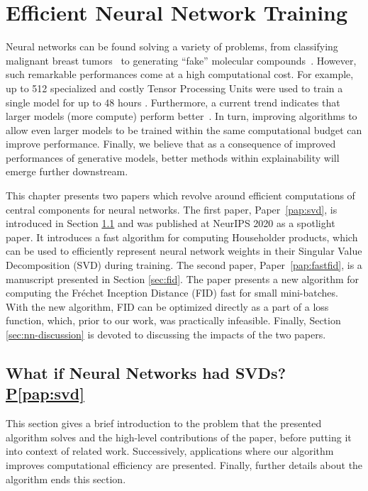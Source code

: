 \documentclass[11pt,a4paper,twoside,openright,final]{memoir}
\newcommand\contribution[1]{\hspace{0.5em}\hyperref[#1]{P\ref{#1}}}
\newcommand*{\paperref}[1]{Paper~\hyperref[#1]{\ref{#1}}}
\begin{document}

\chapter{Efficient Neural Network Training}\label{chap:nns}
Neural networks can be found solving a variety of problems, from classifying malignant breast tumors~\cite{cancer} to generating ``fake'' molecular compounds~\cite{chem-gan}. 
However, such remarkable performances come at a high computational cost.
For example, up to 512 specialized and costly Tensor Processing Units were used to train a single model for up to 48 hours \cite{biggan}. 
Furthermore, a current trend indicates that larger models (more compute) perform better~\cite{language-models-few-shot, scaling-matters}.
In turn, improving algorithms to allow even larger models to be trained within the same computational budget can improve performance.
Finally, we believe that as a consequence of improved performances of generative models, better methods within explainability will emerge further downstream.

This chapter presents two papers which revolve around efficient computations of central components for neural networks.
The first paper, \paperref{pap:svd}, is introduced in Section \ref{sec:svd} and was published at NeurIPS 2020 as a spotlight paper.
It introduces a fast algorithm for computing Householder products, which can be used to efficiently represent neural network weights in their Singular Value Decomposition (SVD) during training.
The second paper, \paperref{pap:fastfid}, is a manuscript presented in Section \ref{sec:fid}. 
The paper presents a new algorithm for computing the Fr\'echet Inception Distance (FID) fast for small mini-batches.
With the new algorithm, FID can be optimized directly as a part of a loss function, which, prior to our work, was practically infeasible. 
Finally, Section \ref{sec:nn-discussion} is devoted to discussing the impacts of the two papers. 

\section[What if Neural Networks had SVDs?]{What if Neural Networks had SVDs?\contribution{pap:svd}} \label{sec:svd}
This section gives a brief introduction to the problem that the presented algorithm solves and the high-level contributions of the paper, before putting it into context of related work. 
Successively, applications where our algorithm improves computational efficiency are presented.
Finally, further details about the algorithm ends this section.
\end{document}
